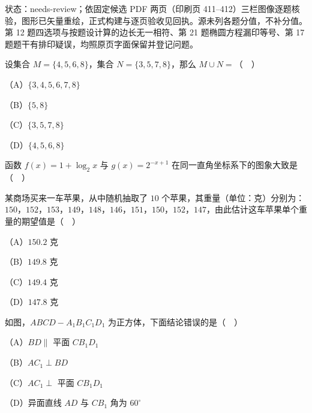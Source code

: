

状态：needs-review；依固定候选 PDF 两页（印刷页 411–412）三栏图像逐题核验，图形已矢量重绘，正式构建与逐页验收见回执。源未列各题分值，不补分值。第 12 题四选项与按题设计算的边长无一相符、第 21 题椭圆方程漏印等号、第 17 题题干有排印疑误，均照原页字面保留并登记问题。


\begin{question}
设集合 $M=\{4,5,6,8\}$，集合 $N=\{3,5,7,8\}$，那么 $M\cup N=$（　）

（A）$\{3,4,5,6,7,8\}$

（B）$\{5,8\}$

（C）$\{3,5,7,8\}$

（D）$\{4,5,6,8\}$

\Needspace{0.4\textheight}
\end{question}
\begin{question}
函数 $f(x)=1+\log_2 x$ 与 $g(x)=2^{-x+1}$ 在同一直角坐标系下的图象大致是（　）
\nopagebreak[4]
\begin{center}\end{center}
\nopagebreak[4]
\end{question}
\begin{question}
某商场买来一车苹果，从中随机抽取了 $10$ 个苹果，其重量（单位：克）分别为：$150$，$152$，$153$，$149$，$148$，$146$，$151$，$150$，$152$，$147$，由此估计这车苹果单个重量的期望值是（　）

（A）$150.2$ 克

（B）$149.8$ 克

（C）$149.4$ 克

（D）$147.8$ 克

\Needspace{0.4\textheight}
\end{question}
\begin{question}
如图，$ABCD-A_1B_1C_1D_1$ 为正方体，下面结论错误的是（　）
\nopagebreak[4]
\begin{center}\end{center}
\nopagebreak[4]
（A）$BD\parallel$ 平面 $CB_1D_1$

（B）$AC_1\perp BD$

（C）$AC_1\perp$ 平面 $CB_1D_1$

（D）异面直线 $AD$ 与 $CB_1$ 角为 $60^\circ$

\end{question}
